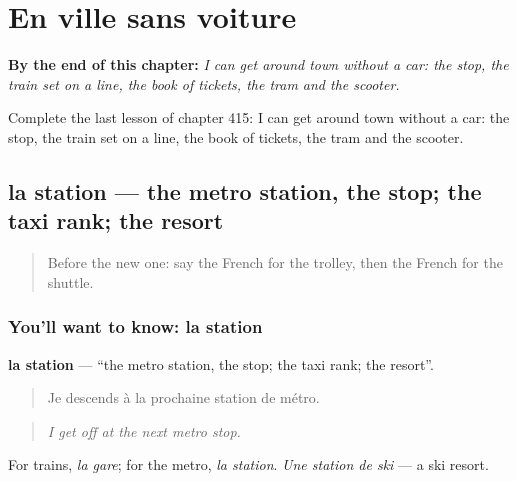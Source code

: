 
\chapter{En ville sans voiture}
\label{ch:fr-en-ville-sans-voiture}

\begin{chapteropening}
\textbf{By the end of this chapter:} \emph{I can get around town without a car: the stop, the train set on a line, the book of tickets, the tram and the scooter.}

Complete the last lesson of chapter 415: I can get around town without a car: the stop, the train set on a line, the book of tickets, the tram and the scooter.
\end{chapteropening}

\section[la station]{la station — the metro station, the stop; the taxi rank; the resort}

\label{lesson:FR-C415-station}



\begin{quote}
Before the new one: say the French for the trolley, then the French for the shuttle.
\end{quote}

\subsection*{You'll want to know: la station}
\textbf{la station} — \textquotedblleft{}the metro station, the stop; the taxi rank; the resort\textquotedblright{}.

\begin{quote}
Je descends à la prochaine station de métro.
\end{quote}

\begin{quote}
\emph{I get off at the next metro stop.}
\end{quote}

For trains, \emph{la gare}; for the metro, \emph{la station}. \emph{Une station de ski} — a ski resort.

